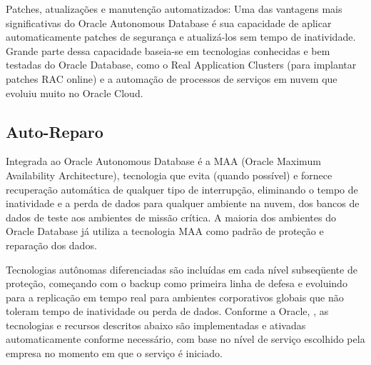 \begin{alineas}
\item Patches, atualizações e manutenção automatizados: Uma das vantagens mais significativas do Oracle Autonomous Database é sua capacidade de aplicar automaticamente patches de segurança e atualizá-los sem tempo de inatividade. Grande parte dessa capacidade baseia-se em tecnologias conhecidas e bem testadas do Oracle Database, como o Real Application Clusters (para implantar patches RAC online) e a automação de processos de serviços em nuvem que evoluiu muito no Oracle Cloud.
\end{alineas}


\subsection{Auto-Reparo}


Integrada ao Oracle Autonomous Database é a MAA (Oracle Maximum Availability Architecture), tecnologia que evita (quando possível) e fornece recuperação automática de qualquer tipo de interrupção, eliminando o tempo de inatividade e a perda de dados para qualquer ambiente na nuvem, dos bancos de dados de teste aos ambientes de missão crítica. A maioria dos ambientes do Oracle Database já utiliza a tecnologia MAA como padrão de proteção e reparação dos dados.

Tecnologias autônomas diferenciadas são incluídas em cada nível subseqüente de proteção, começando com o backup como primeira linha de defesa e evoluindo para a replicação em tempo real para ambientes corporativos globais que não toleram tempo de inatividade ou perda de dados. Conforme a Oracle, \cite{WPReparo}, as tecnologias e recursos descritos abaixo são implementadas e ativadas automaticamente conforme necessário, com base no nível de serviço escolhido pela empresa no momento em que o serviço é iniciado.

